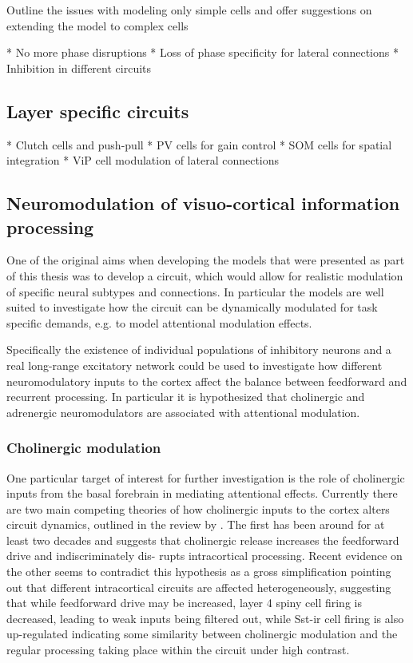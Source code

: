 Outline the issues with modeling only simple cells and offer
suggestions on extending the model to complex cells

* No more phase disruptions
* Loss of phase specificity for lateral connections
* Inhibition in different circuits

\subsection{Layer specific circuits}

* Clutch cells and push-pull
* PV cells for gain control
* SOM cells for spatial integration
* ViP cell modulation of lateral connections

\subsection{Neuromodulation of visuo-cortical information processing}

One of the original aims when developing the models that were
presented as part of this thesis was to develop a circuit, which would
allow for realistic modulation of specific neural subtypes and
connections. In particular the models are well suited to investigate
how the circuit can be dynamically modulated for task specific
demands, e.g. to model attentional modulation effects.

Specifically the existence of individual populations of inhibitory
neurons and a real long-range excitatory network could be used to
investigate how different neuromodulatory inputs to the cortex affect
the balance between feedforward and recurrent processing. In
particular it is hypothesized that cholinergic and adrenergic
neuromodulators are associated with attentional modulation.

\subsubsection{Cholinergic modulation}

One particular target of interest for further investigation is the
role of cholinergic inputs from the basal forebrain in mediating
attentional effects. Currently there are two main competing theories
of how cholinergic inputs to the cortex alters circuit dynamics,
outlined in the review by \cite{Thiele2013}. The first has been around
for at least two decades and suggests that cholinergic release
increases the feedforward drive and indiscriminately dis- rupts
intracortical processing. Recent evidence on the other seems to
contradict this hypothesis as a gross simplification pointing out that
different intracortical circuits are affected heterogeneously,
suggesting that while feedforward drive may be increased, layer 4
spiny cell firing is decreased, leading to weak inputs being filtered
out, while Sst-ir cell firing is also up-regulated indicating some
similarity between cholinergic modulation and the regular processing
taking place within the circuit under high contrast.

